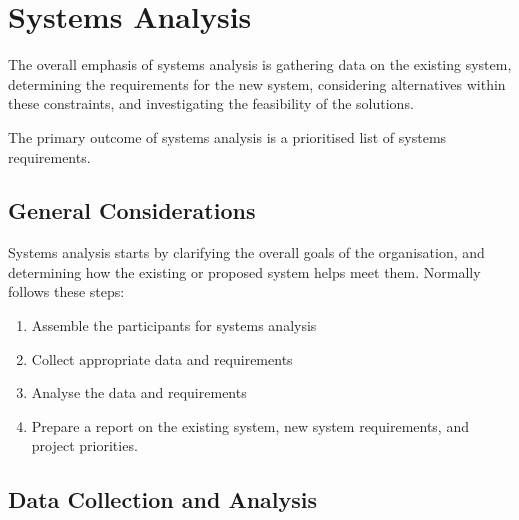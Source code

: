 \documentclass[\main/notes.tex]{subfiles}
\begin{document}
		\section{Systems Analysis}
			The overall emphasis of systems analysis is gathering data on the existing system, determining the requirements for the new system, considering alternatives within these constraints, and investigating the feasibility of the solutions.

			The primary outcome of systems analysis is a prioritised list of systems requirements.
			\subsection{General Considerations}
				Systems analysis starts by clarifying the overall goals of the organisation, and determining how the existing or proposed system helps meet them. Normally follows these steps:
				\begin{enumerate}[nosep]
					\item Assemble the participants for systems analysis
					\item Collect appropriate data and requirements
					\item Analyse the data and requirements
					\item Prepare a report on the existing system, new system requirements, and project priorities.
				\end{enumerate}
			\subsection{Data Collection and Analysis}
\end{document}
